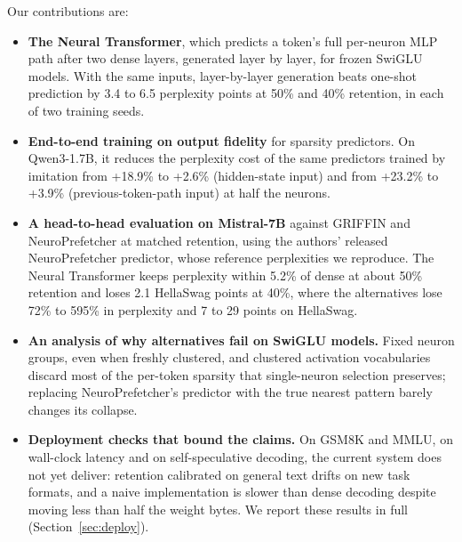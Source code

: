 \documentclass[10pt,twocolumn,letterpaper]{article}
\begin{document}
Our contributions are:
\begin{itemize}
\item \textbf{The Neural Transformer}, which predicts a token's full per-neuron MLP path after two dense layers, generated layer by layer, for frozen SwiGLU models. With the same inputs, layer-by-layer generation beats one-shot prediction by 3.4 to 6.5 perplexity points at 50\% and 40\% retention, in each of two training seeds.
\item \textbf{End-to-end training on output fidelity} for sparsity predictors. On Qwen3-1.7B, it reduces the perplexity cost of the same predictors trained by imitation from +18.9\% to +2.6\% (hidden-state input) and from +23.2\% to +3.9\% (previous-token-path input) at half the neurons.
\item \textbf{A head-to-head evaluation on Mistral-7B} against GRIFFIN and NeuroPrefetcher at matched retention, using the authors' released NeuroPrefetcher predictor, whose reference perplexities we reproduce. The Neural Transformer keeps perplexity within 5.2\% of dense at about 50\% retention and loses 2.1 HellaSwag points at 40\%, where the alternatives lose 72\% to 595\% in perplexity and 7 to 29 points on HellaSwag.
\item \textbf{An analysis of why alternatives fail on SwiGLU models.} Fixed neuron groups, even when freshly clustered, and clustered activation vocabularies discard most of the per-token sparsity that single-neuron selection preserves; replacing NeuroPrefetcher's predictor with the true nearest pattern barely changes its collapse.
\item \textbf{Deployment checks that bound the claims.} On GSM8K and MMLU, on wall-clock latency and on self-speculative decoding, the current system does not yet deliver: retention calibrated on general text drifts on new task formats, and a naive implementation is slower than dense decoding despite moving less than half the weight bytes. We report these results in full (Section~\ref{sec:deploy}).
\end{itemize}
\end{document}
